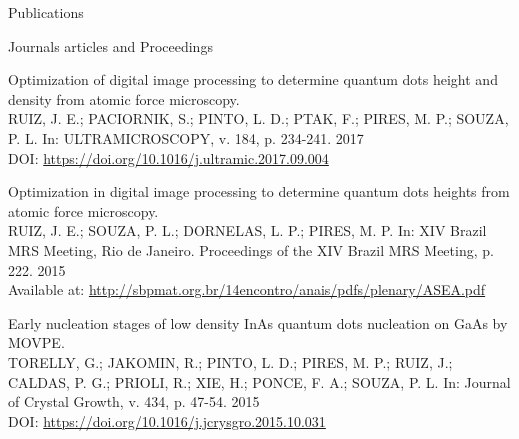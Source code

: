 \documentclass{resume} %
\begin{document}
\begin{rSection}{Publications}
\begin{rSubsection}{Journals articles and Proceedings}{}{}{}
            \item Optimization of digital image processing to determine quantum dots height and density from atomic force microscopy. \\ {\normalfont RUIZ, J. E.; PACIORNIK, S.; PINTO, L. D.; PTAK, F.; PIRES, M. P.; SOUZA, P. L.} In:  {\normalfont ULTRAMICROSCOPY, v. 184, p. 234-241. 2017} \\ DOI: {\normalfont  \url{https://doi.org/10.1016/j.ultramic.2017.09.004}}
            \item Optimization in digital image processing to determine quantum dots heights from atomic force microscopy. \\ {\normalfont RUIZ, J. E.; SOUZA, P. L.; DORNELAS, L. P.; PIRES, M. P.} In:  {\normalfont XIV Brazil MRS Meeting, Rio de Janeiro. Proceedings of the XIV Brazil MRS Meeting, p. 222. 2015} \\ Available at: {\normalfont  \url{http://sbpmat.org.br/14encontro/anais/pdfs/plenary/ASEA.pdf}}
            \item Early nucleation stages of low density InAs quantum dots nucleation on GaAs by MOVPE. \\ {\normalfont TORELLY, G.; JAKOMIN, R.; PINTO, L. D.; PIRES, M. P.; RUIZ, J.; CALDAS, P. G.; PRIOLI, R.; XIE, H.; PONCE, F. A.; SOUZA, P. L.} In:  {\normalfont Journal of Crystal Growth, v. 434, p. 47-54. 2015} \\ DOI: {\normalfont  \url{https://doi.org/10.1016/j.jcrysgro.2015.10.031}}
        \end{rSubsection}


\end{rSection}
\end{document}

